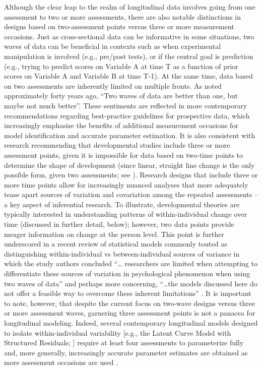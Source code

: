 \documentclass[
  10pt,
  letterpaper,
]{article}
\begin{document}
Although the clear leap to the realm of longitudinal data involves going
from one assessment to two or more assessments, there are also notable
distinctions in designs based on two-assessment points versus three or
more measurement occasions. Just as cross-sectional data can be
informative in some situations, two waves of data can be beneficial in
contexts such as when experimental manipulation is involved (e.g.,
pre/post tests), or if the central goal is prediction (e.g., trying to
predict scores on Variable A at time T as a function of prior scores on
Variable A and Variable B at time T-1). At the same time, data based on
two assessments are inherently limited on multiple fronts. As
\citep{rogosa1982} noted approximately forty years ago, ``Two waves of
data are better than one, but maybe not much better''. These sentiments
are reflected in more contemporary recommendations regarding
best-practice guidelines for prospective data, which increasingly
emphasize the benefits of additional measurement occasions for model
identification and accurate parameter estimation. It is also consistent
with research recommending that developmental studies include three or
more assessment points, given it is impossible for data based on
two-time points to determine the shape of development (since linear,
straight line change is the only possible form, given two assessments;
see \citep{duncan2009}). Research designs that include three or more
time points allow for increasingly nuanced analyses that more adequately
tease apart sources of variation and covariation among the repeated
assessments \citep{king2018}-- a key aspect of inferential research. To
illustrate, developmental theories are typically interested in
understanding patterns of within-individual change over time (discussed
in further detail, below); however, two data points provide meager
information on change at the person level. This point is further
underscored in a recent review of statistical models commonly touted as
distinguishing within-individual vs between-individual sources of
variance in which the study authors concluded ``\ldots{} researchers are
limited when attempting to differentiate these sources of variation in
psychological phenomenon when using two waves of data'' and perhaps more
concerning, ``\ldots the models discussed here do not offer a feasible
way to overcome these inherent limitations''
\citet{littlefield20210603}. It is important to note, however, that
despite the current focus on two-wave designs versus three or more
assessment waves, garnering three assessment points is not a panacea for
longitudinal modeling. Indeed, several contemporary longitudinal models
designed to isolate within-individual variability {[}e.g., the Latent
Curve Model with Structured Residuals; \citet{curran2014a}{]} require at
least four assessments to parameterize fully and, more generally,
increasingly accurate parameter estimates are obtained as more
assessment occasions are used \citep{duncan2009}.
\end{document}
